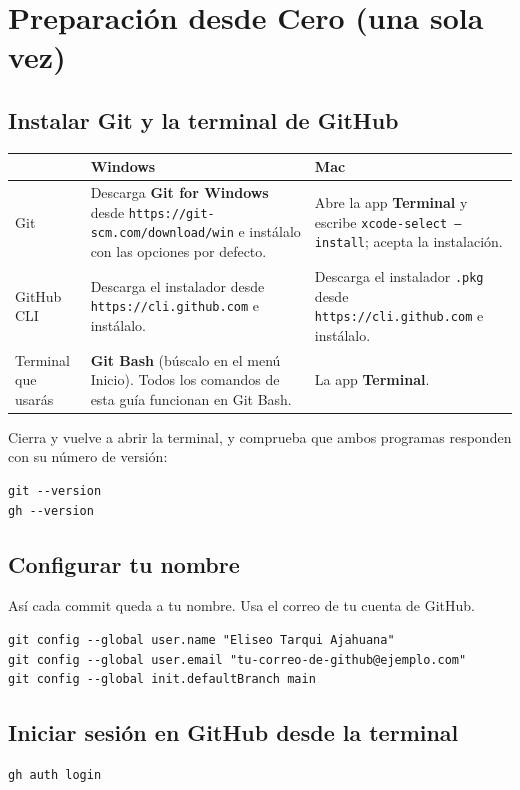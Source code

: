 \documentclass[11pt,a4paper]{article}
\begin{document}
\section{Preparación desde Cero (una sola vez)}

\subsection{Instalar Git y la terminal de GitHub}
{\small
{}
\noindent\begin{tabularx}{\textwidth}{@{}P{2.2cm} L L@{}}
\toprule
{}
& \textbf{Windows} & \textbf{Mac} \\
\midrule
Git & Descarga \textbf{Git for Windows} desde \nolinkurl{https://git-scm.com/download/win} e instálalo con las opciones por defecto. & Abre la app \textbf{Terminal} y escribe \texttt{xcode-select --install}; acepta la instalación. \\
GitHub CLI & Descarga el instalador desde \nolinkurl{https://cli.github.com} e instálalo. & Descarga el instalador \texttt{.pkg} desde \nolinkurl{https://cli.github.com} e instálalo. \\
Terminal que usarás & \textbf{Git Bash} (búscalo en el menú Inicio). Todos los comandos de esta guía funcionan en Git Bash. & La app \textbf{Terminal}. \\
\bottomrule
\end{tabularx}
}

\vspace{0.1cm}
\noindent Cierra y vuelve a abrir la terminal, y comprueba que ambos programas responden con su número de versión:

\begin{lstlisting}
git --version
gh --version
\end{lstlisting}

\subsection{Configurar tu nombre}
Así cada commit queda a tu nombre. Usa el correo de tu cuenta de GitHub.

\begin{lstlisting}
git config --global user.name "Eliseo Tarqui Ajahuana"
git config --global user.email "tu-correo-de-github@ejemplo.com"
git config --global init.defaultBranch main
\end{lstlisting}

\subsection{Iniciar sesión en GitHub desde la terminal}
\begin{lstlisting}
gh auth login
\end{lstlisting}
\end{document}
